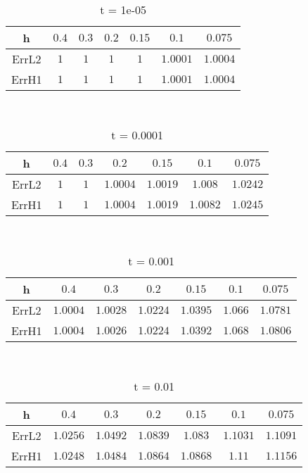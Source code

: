 \documentclass{standalone}
\begin{document}
\clearpage
\hfill \\ 
\begin{table}[!h]
\centering
\begin{tabular}{ | c | c | c | c | c | c | c | }
\hline
h	&	$0.4$ & $0.3$ & $0.2$ & $0.15$ & $0.1$ & $0.075$ \\ \hline
ErrL2	&	$1$ & $1$ & $1$ & $1$ & $1.0001$ & $1.0004$ \\ \hline
ErrH1	&	$1$ & $1$ & $1$ & $1$ & $1.0001$ & $1.0004$ \\ \hline
\end{tabular}
\caption{t = 1e-05 }
\end{table}

\hfill \\ 
\begin{table}[!h]
\centering
\begin{tabular}{ | c | c | c | c | c | c | c | }
\hline
h	&	$0.4$ & $0.3$ & $0.2$ & $0.15$ & $0.1$ & $0.075$ \\ \hline
ErrL2	&	$1$ & $1$ & $1.0004$ & $1.0019$ & $1.008$ & $1.0242$ \\ \hline
ErrH1	&	$1$ & $1$ & $1.0004$ & $1.0019$ & $1.0082$ & $1.0245$ \\ \hline
\end{tabular}
\caption{t = 0.0001 }
\end{table}

\hfill \\ 
\begin{table}[!h]
\centering
\begin{tabular}{ | c | c | c | c | c | c | c | }
\hline
h	&	$0.4$ & $0.3$ & $0.2$ & $0.15$ & $0.1$ & $0.075$ \\ \hline
ErrL2	&	$1.0004$ & $1.0028$ & $1.0224$ & $1.0395$ & $1.066$ & $1.0781$ \\ \hline
ErrH1	&	$1.0004$ & $1.0026$ & $1.0224$ & $1.0392$ & $1.068$ & $1.0806$ \\ \hline
\end{tabular}
\caption{t = 0.001 }
\end{table}

\hfill \\ 
\begin{table}[!h]
\centering
\begin{tabular}{ | c | c | c | c | c | c | c | }
\hline
h	&	$0.4$ & $0.3$ & $0.2$ & $0.15$ & $0.1$ & $0.075$ \\ \hline
ErrL2	&	$1.0256$ & $1.0492$ & $1.0839$ & $1.083$ & $1.1031$ & $1.1091$ \\ \hline
ErrH1	&	$1.0248$ & $1.0484$ & $1.0864$ & $1.0868$ & $1.11$ & $1.1156$ \\ \hline
\end{tabular}
\caption{t = 0.01 }
\end{table}


\clearpage
\end{document}
